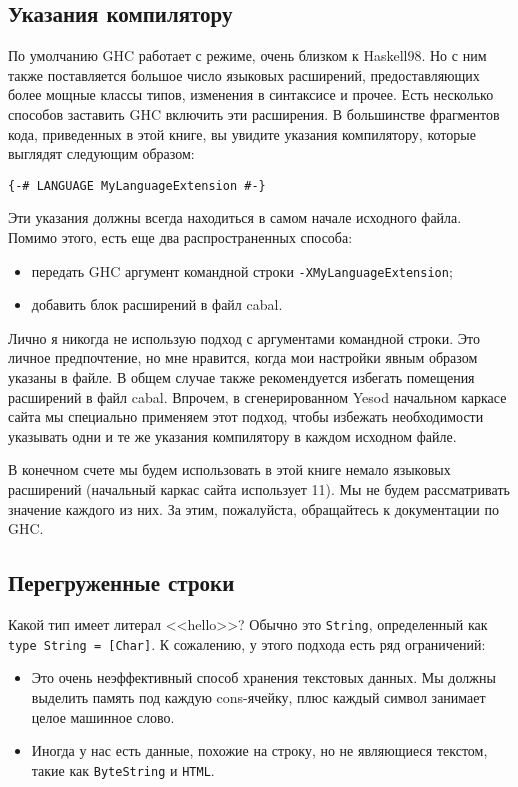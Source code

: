 \subsection{Указания компилятору}

По умолчанию GHC работает с режиме, очень близком к Haskell98. Но с ним также поставляется большое число языковых расширений, предоставляющих более мощные классы типов, изменения в синтаксисе и прочее. Есть несколько способов заставить GHC включить эти расширения. В большинстве фрагментов кода, приведенных в этой книге, вы увидите указания компилятору, которые выглядят следующим образом:

\begin{lstlisting}
{-# LANGUAGE MyLanguageExtension #-}
\end{lstlisting}

Эти указания должны всегда находиться в самом начале исходного файла. Помимо этого, есть еще два распространенных способа:
\begin{itemize}
\item передать GHC аргумент командной строки \lstinline'-XMyLanguageExtension';
\item добавить блок расширений в файл cabal.
\end{itemize}

Лично я никогда не использую подход с аргументами командной строки. Это личное предпочтение, но мне нравится, когда мои настройки явным образом указаны в файле. В общем случае также рекомендуется избегать помещения расширений в файл cabal. Впрочем, в сгенерированном Yesod начальном каркасе сайта мы специально применяем этот подход, чтобы избежать необходимости указывать одни и те же указания компилятору в каждом исходном файле.

В конечном счете мы будем использовать в этой книге немало языковых расширений (начальный каркас сайта использует 11). Мы не будем рассматривать значение каждого из них. За этим, пожалуйста, обращайтесь к документации по GHC.

\subsection{Перегруженные строки}

Какой тип имеет литерал <<hello>>? Обычно это \lstinline'String', определенный как \lstinline'type String = [Char]'. К сожалению, у этого подхода есть ряд ограничений:
\begin{itemize}
\item Это очень неэффективный способ хранения текстовых данных. Мы должны выделить память под каждую cons-ячейку, плюс каждый символ занимает целое машинное слово.
\item Иногда у нас есть данные, похожие на строку, но не являющиеся текстом, такие как \lstinline'ByteString' и \lstinline'HTML'.
\end{itemize}

